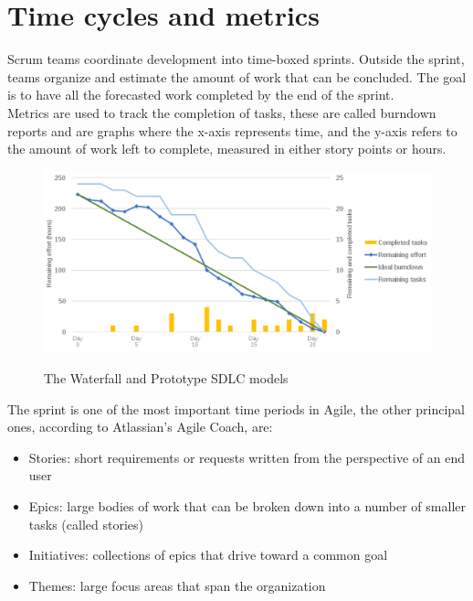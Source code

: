 \section{Time cycles and metrics}
	Scrum teams coordinate development into time-boxed sprints.
	Outside the sprint, teams organize and estimate the amount of work that can be concluded.
	The goal is to have all the forecasted work completed by the end of the sprint.\\
	Metrics are used to track the completion of tasks, these are called burndown reports and are graphs where the x-axis represents time, and the y-axis refers to the amount of work left to complete, measured in either story points or hours.\\
	\begin{figure}[H]
		\centering
		\includegraphics[width=\textwidth]{resources/burndown}\\
		\caption{The Waterfall and Prototype SDLC models}
	\end{figure}
	The sprint is one of the most important time periods in Agile, the other principal ones, according to Atlassian's Agile Coach\cite{epics-stories-themes}, are:
	\begin{itemize}
		\item Stories: short requirements or requests written from the perspective of an end user
		\item Epics: large bodies of work that can be broken down into a number of smaller tasks (called stories)
		\item Initiatives: collections of epics that drive toward a common goal
		\item Themes: large focus areas that span the organization
	\end{itemize}
